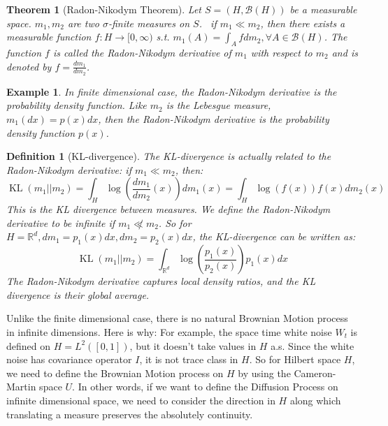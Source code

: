 \documentclass{article}
\newtheorem{theorem}{Theorem}
\newtheorem{definition}{Definition}
\newtheorem{example}{Example}
\begin{document}
\begin{theorem}[Radon-Nikodym Theorem]
  Let $S = (H,\mathcal{B}(H))$ be a measurable space. $m_1, m_2$ are two $\sigma$-finite measures on $S$. \
  if $m_1 \ll m_2$, then there exists a measurable function $f:H\rightarrow [0, \infty)$ s.t. $m_1(A) = \int_A f dm_2, \forall A \in \mathcal{B}(H)$.
  The function $f$ is called the Radon-Nikodym derivative of $m_1$ with respect to $m_2$ and is denoted by $f = \frac{dm_1}{dm_2}$.
\end{theorem}

\begin{example}
  In finite dimensional case, the Radon-Nikodym derivative is the probability density function. 
  Like $m_2$ is the Lebesgue measure, $m_1(dx) = p(x)dx$, then the Radon-Nikodym derivative is the probability density function $p(x)$. 
\end{example}

\begin{definition}[KL-divergence]
  The KL-divergence is actually related to the Radon-Nikodym derivative: if $m_1 \ll m_2$, then:
  \begin{equation}
    \operatorname{KL}(m_1||m_2) = \int_H \log\left(\frac{dm_1}{dm_2}(x)\right) dm_1(x) 
    = \int_H \log\left(f(x)\right) f(x)dm_2(x)
  \end{equation}
  This is the KL divergence between measures. We define the Radon-Nikodym derivative to be infinite if $m_1 \not\ll m_2$.
  So for $H=\mathbb{R}^d, dm_1 = p_1(x)dx, dm_2 = p_2(x)dx$, the KL-divergence can be written as:
  \begin{equation}
    \operatorname{KL}(m_1||m_2) = \int_{\mathbb{R}^d} \log\left(\frac{p_1(x)}{p_2(x)}\right) p_1(x) dx
  \end{equation}
  The Radon-Nikodym derivative captures local density ratios, and the KL divergence is their global average.
\end{definition}

Unlike the finite dimensional case, there is no natural Brownian Motion process in infinite dimensions. 
Here is why: For example, the space time white noise $W_t$ is defined on $H=L^2([0, 1])$, but it doesn't take values in $H$ a.s.
Since the white noise has covariance operator $I$, it is not trace class in $H$. 
So for Hilbert space $H$, we need to define the Brownian Motion process on $H$ by using the Cameron-Martin space $U$.
In other words, if we want to define the Diffusion Process on infinite dimensional space, 
we need to consider the direction in $H$ along which translating a measure preserves the absolutely continuity.
\end{document}
